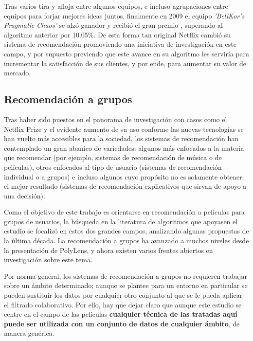 Tras varios tira y afloja entre algunos equipos, e incluso agrupaciones entre equipos para forjar mejores ideas juntos, finalmente en 2009 el equipo \textit{'BellKor's Pragmatic Chaos'} se alzó ganador y recibió el gran premio \cite{netflix-prize-winner}, superando al algoritmo anterior por 10.05\%. De esta forma tan original Netflix cambió su sistema de recomendación promoviendo una iniciativa de investigación en este campo, y por supuesto previendo que este avance en su algoritmo les serviría para incrementar la satisfacción de sus clientes, y por ende, para aumentar su valor de mercado.

\subsection{Recomendación a grupos}

Tras haber sido puestos en el panorama de investigación con casos como el Netflix Prize y el evidente aumento de su uso conforme las nuevas tecnologías se han vuelto más accesibles para la sociedad, los sistemas de recomendación han contemplado un gran abanico de variedades: algunos más enfocados a la materia que recomendar (por ejemplo, sistemas de recomendación de música o de películas), otros enfocados al tipo de usuario (sistemas de recomendación individual o a grupos) e incluso algunos cuyo propósito no es solamente obtener el mejor resultado (sistemas de recomendación explicativos que sirvan de apoyo a una decisión).

Como el objetivo de este trabajo es orientarse en recomendación a películas para grupos de usuarios, la búsqueda en la literatura de algoritmos que apoyasen el estudio se focalizó en estos dos grandes campos, analizando algunas propuestas de la última década. La recomendación a grupos ha avanzado a muchos niveles desde la presentación de PolyLens, y ahora existen varios frentes abiertos en investigación sobre este tema.

Por norma general, los sistemas de recomendación a grupos no requieren trabajar sobre un ámbito determinado; aunque se plantee para un entorno en particular se pueden sustituir los datos por cualquier otro conjunto al que se le pueda aplicar el filtrado colaborativo. Por ello, hay que dejar claro que aunque este estudio se centre en el campo de las películas \textbf{cualquier técnica de las tratadas aquí puede ser utilizada con un conjunto de datos de cualquier ámbito}, de manera genérica.

